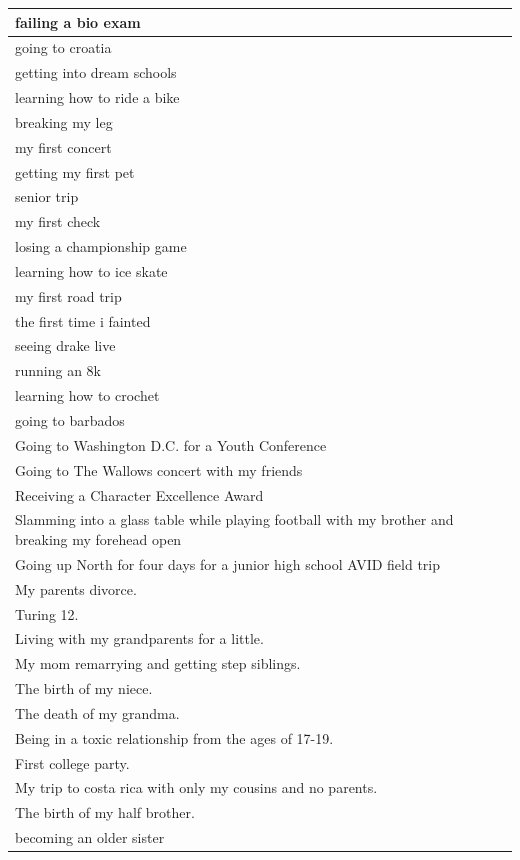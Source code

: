 \documentclass[
  .7em,
  letterpaper,
  DIV=11,
  numbers=noendperiod]{scrartcl}
\begin{document}
\begin{table}
\begin{tabular}{l}
\hline
failing a bio exam\\
\hline
going to croatia\\
\hline
getting into dream schools\\
\hline
learning how to ride a bike\\
\hline
breaking my leg\\
\hline
my first concert\\
\hline
getting my first pet\\
\hline
senior trip\\
\hline
my first check\\
\hline
losing a championship game\\
\hline
learning how to ice skate\\
\hline
my first road trip\\
\hline
the first time i fainted\\
\hline
seeing drake live\\
\hline
running an 8k\\
\hline
learning how to crochet\\
\hline
going to barbados\\
\hline
Going to Washington D.C. for a Youth Conference\\
\hline
Going to The Wallows concert with my friends\\
\hline
Receiving a Character Excellence Award\\
\hline
Slamming into a glass table while playing football with my brother and breaking my forehead open\\
\hline
Going up North for four days for a junior high school AVID field trip\\
\hline
My parents divorce.\\
\hline
Turing 12.\\
\hline
Living with my grandparents for a little.\\
\hline
My mom remarrying and getting step siblings.\\
\hline
The birth of my niece.\\
\hline
The death of my grandma.\\
\hline
Being in a toxic relationship from the ages of 17-19.\\
\hline
First college party.\\
\hline
My trip to costa rica with only my cousins and no parents.\\
\hline
The birth of my half brother.\\
\hline
becoming an older sister\\

\end{tabular}
\end{table}
\end{document}
